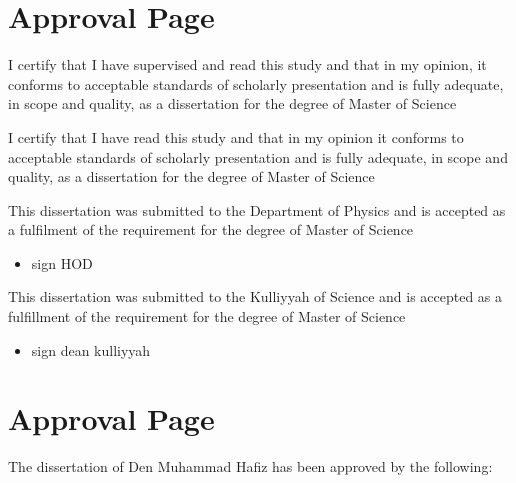 \section*{Approval Page}

\noindent I certify that I have supervised and read this study and that in my opinion, it conforms to acceptable standards of scholarly presentation and is fully adequate, in scope and quality, as a dissertation for the degree of Master of Science 



\vspace{0.5cm}

\noindent I certify that I have read this study and that in my opinion it conforms to acceptable standards of scholarly presentation and is fully adequate, in scope and quality, as a dissertation for the degree of Master of Science


\vspace{0.5cm}

\noindent This dissertation was submitted to the Department of Physics and is accepted as a fulfilment of the requirement for the degree of Master of Science

\begin{itemize}
    \item sign HOD
\end{itemize}

\noindent This dissertation was submitted to the Kulliyyah of Science and is accepted as a
fulfillment of the requirement for the degree of Master of Science

\begin{itemize}
    \item sign dean kulliyyah
\end{itemize}

\newpage
\section*{Approval Page}
\begin{center}
    The dissertation of Den Muhammad Hafiz has been approved by the following:

    
\end{center}